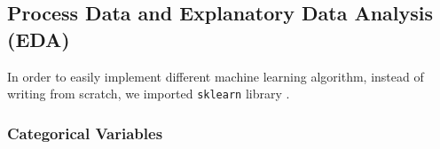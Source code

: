 \documentclass[11pt,a4paper]{article}
\begin{document}
    \subsection{Process Data and Explanatory Data Analysis (EDA)}



    In order to easily implement different machine learning algorithm, instead of writing from scratch, we imported \texttt{sklearn} library \cite{sklearn_api}.
    
    
    
    
    \subsubsection{Categorical Variables}

\end{document}
